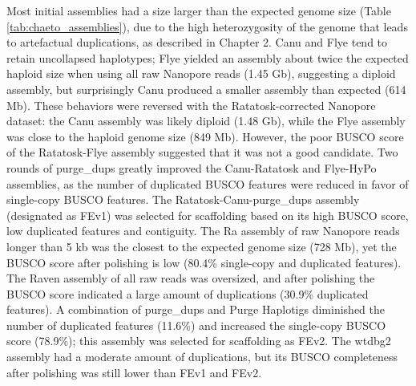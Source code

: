 Most initial assemblies had a size larger than the expected genome size (Table \ref{tab:chaeto_assemblies}), due to the high heterozygosity of the genome that leads to artefactual duplications, as described in Chapter 2. Canu and Flye tend to retain uncollapsed haplotypes; Flye yielded an assembly about twice the expected haploid size when using all raw Nanopore reads (1.45 Gb), suggesting a diploid assembly, but surprisingly Canu produced a smaller assembly than expected (614 Mb). These behaviors were reversed with the Ratatosk-corrected Nanopore dataset: the Canu assembly was likely diploid (1.48 Gb), while the Flye assembly was close to the haploid genome size (849 Mb). However, the poor BUSCO score of the Ratatosk-Flye assembly suggested that it was not a good candidate. Two rounds of purge\_dups greatly improved the Canu-Ratatosk and Flye-HyPo assemblies, as the number of duplicated BUSCO features were reduced in favor of single-copy BUSCO features. The Ratatosk-Canu-purge\_dups assembly (designated as FEv1) was selected for scaffolding based on its high BUSCO score, low duplicated features and contiguity. The Ra assembly of raw Nanopore reads longer than 5 kb was the closest to the expected genome size (728 Mb), yet the BUSCO score after polishing is low (80.4\% single-copy and duplicated features). The Raven assembly of all raw reads was oversized, and after polishing the BUSCO score indicated a large amount of duplications (30.9\% duplicated features). A combination of purge\_dups and Purge Haplotigs diminished the number of duplicated features (11.6\%) and increased the single-copy BUSCO score (78.9\%); this assembly was selected for scaffolding as FEv2. The wtdbg2 assembly had a moderate amount of duplications, but its BUSCO completeness after polishing was still lower than FEv1 and FEv2.

